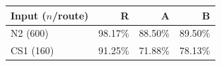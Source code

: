 \begin{tabular}{lrrr}
\toprule
Input ($n$/route) & R & A & B \\
\midrule
N2 (600) & 98.17\% & 88.50\% & 89.50\% \\
CS1 (160) & 91.25\% & 71.88\% & 78.13\% \\
\bottomrule
\end{tabular}
